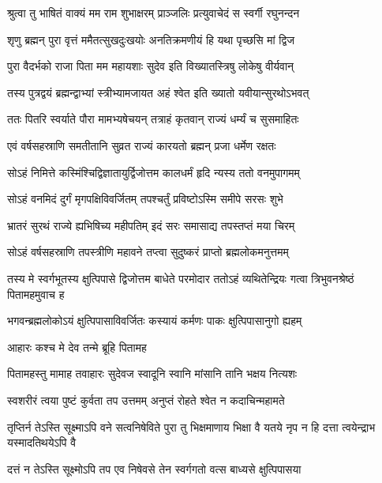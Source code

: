 
\twolineshloka
{श्रुत्वा तु भाषितं वाक्यं मम राम शुभाक्षरम्}
{प्राञ्जलिः प्रत्युवाचेदं स स्वर्गी रघुनन्दन} %

\twolineshloka
{शृणु ब्रह्मन् पुरा वृत्तं ममैतत्सुखदुःखयोः}
{अनतिक्रमणीयं हि यथा पृच्छसि मां द्विज} %

\twolineshloka
{पुरा वैदर्भको राजा पिता मम महायशाः}
{सुदेव इति विख्यातस्त्रिषु लोकेषु वीर्यवान्} %

\twolineshloka
{तस्य पुत्रद्वयं ब्रह्मन्द्वाभ्यां स्त्रीभ्यामजायत}
{अहं श्वेत इति ख्यातो यवीयान्सुरथोऽभवत्} %

\twolineshloka
{ततः पितरि स्वर्याते पौरा मामभ्यषेचयन्}
{तत्राहं कृतवान् राज्यं धर्म्यं च सुसमाहितः} %

\twolineshloka
{एवं वर्षसहस्राणि समतीतानि सुव्रत}
{राज्यं कारयतो ब्रह्मन् प्रजा धर्मेण रक्षतः} %

\twolineshloka
{सोऽहं निमित्ते कस्मिंश्चिद्विज्ञातायुर्द्विजोत्तम}
{कालधर्मं हृदि न्यस्य ततो वनमुपागमम्} %

\twolineshloka
{सोऽहं वनमिदं दुर्गं मृगपक्षिविवर्जितम्}
{तपश्चर्तुं प्रविष्टोऽस्मि समीपे सरसः शुभे} %

\twolineshloka
{भ्रातरं सुरथं राज्ये ह्यभिषिच्य महीपतिम्}
{इदं सरः समासाद्य तपस्तप्तं मया चिरम्} %

\twolineshloka
{सोऽहं वर्षसहस्राणि तपस्त्रीणि महावने}
{तप्त्वा सुदुष्करं प्राप्तो ब्रह्मलोकमनुत्तमम्} %

\threelineshloka
{तस्य मे स्वर्गभूतस्य क्षुत्पिपासे द्विजोत्तम}
{बाधेते परमोदार ततोऽहं व्यथितेन्द्रियः}
{गत्वा त्रिभुवनश्रेष्ठं पितामहमुवाच ह} %

\twolineshloka
{भगवन्ब्रह्मलोकोऽयं क्षुत्पिपासाविवर्जितः}
{कस्यायं कर्मणः पाकः क्षुत्पिपासानुगो ह्यहम्} %

\onelineshloka
{आहारः कश्च मे देव तन्मे ब्रूहि पितामह} %

\twolineshloka
{पितामहस्तु मामाह तवाहारः सुदेवज}
{स्वादूनि स्वानि मांसानि तानि भक्षय नित्यशः} %

\twolineshloka
{स्वशरीरं त्वया पुष्टं कुर्वता तप उत्तमम्}
{अनुप्तं रोहते श्वेत न कदाचिन्महामते} %

\threelineshloka
{तृप्तिर्न तेऽस्ति सूक्ष्माऽपि वने सत्वनिषेविते}
{पुरा तु भिक्षमाणाय भिक्षा वै यतये नृप}
{न हि दत्ता त्वयेन्द्राभ यस्मादतिथयेऽपि वै} %

\twolineshloka
{दत्तं न तेऽस्ति सूक्ष्मोऽपि तप एव निषेवसे}
{तेन स्वर्गगतो वत्स बाध्यसे क्षुत्पिपासया} %

